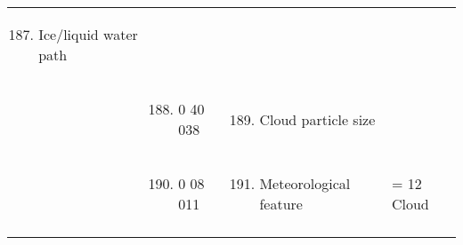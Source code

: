 \begin{longtable}[]{@{}llll@{}}
\begin{minipage}[t]{0.22\columnwidth}
\begin{enumerate}
\setcounter{enumi}{186}
\item
  Ice/liquid water path
\end{enumerate}\strut
\end{minipage} & \begin{minipage}[t]{0.22\columnwidth}\raggedright
\strut
\end{minipage}\tabularnewline
\begin{minipage}[t]{0.22\columnwidth}\raggedright
\strut
\end{minipage} & \begin{minipage}[t]{0.22\columnwidth}\raggedright
\begin{enumerate}
\setcounter{enumi}{187}
\item
  0 40 038
\end{enumerate}\strut
\end{minipage} & \begin{minipage}[t]{0.22\columnwidth}\raggedright
\begin{enumerate}
\setcounter{enumi}{188}
\item
  Cloud particle size
\end{enumerate}\strut
\end{minipage} & \begin{minipage}[t]{0.22\columnwidth}\raggedright
\strut
\end{minipage}\tabularnewline
\begin{minipage}[t]{0.22\columnwidth}\raggedright
\strut
\end{minipage} & \begin{minipage}[t]{0.22\columnwidth}\raggedright
\begin{enumerate}
\setcounter{enumi}{189}
\item
  0 08 011
\end{enumerate}\strut
\end{minipage} & \begin{minipage}[t]{0.22\columnwidth}\raggedright
\begin{enumerate}
\setcounter{enumi}{190}
\item
  Meteorological feature
\end{enumerate}\strut
\end{minipage} & \begin{minipage}[t]{0.22\columnwidth}\raggedright
= 12 Cloud\strut
\end{minipage}\tabularnewline
\begin{minipage}[t]{0.22\columnwidth}\raggedright
\strut

\end{minipage}
\end{longtable}
